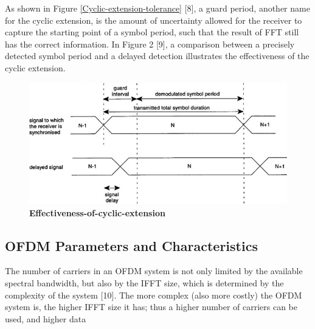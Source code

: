 As shown in Figure \ref{Cyclic-extension-tolerance} [8], a guard period, another name for the cyclic extension, is the amount of uncertainty allowed for the receiver to capture the starting point of a symbol period, such that the result of FFT still has the correct information. In Figure 2 [9], a comparison between a precisely detected symbol period and a delayed detection illustrates the effectiveness of the cyclic extension.

\begin{figure}[ht]
    \centering
    \includegraphics[width=\textwidth]{Figures/Effectiveness-of-cyclic-extension.jpg}
    \caption{\bfseries\centering\fontsize{13pt}{0pt}\selectfont Effectiveness-of-cyclic-extension}
    \label{Effectiveness-of-cyclic-extension}
\end{figure}

\subsection{OFDM Parameters and Characteristics}

The number of carriers in an OFDM system is not only limited by the
available spectral bandwidth, but also by the IFFT size, which is determined by the complexity of the system [10]. The more complex (also more costly) the OFDM system is, the higher
IFFT size it has; thus a higher number of carriers can be used, and higher data